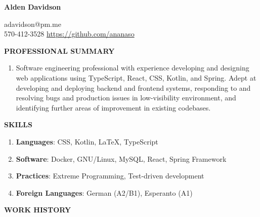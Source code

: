 \documentclass[11pt]{article}
\begin{document}
\begin{center}
\begin{minipage}{0.70\textwidth}
	{\Huge\textbf{Alden Davidson}}
\end{minipage}%
\begin{minipage}{0.30\textwidth}
	\raggedleft
	adavidson@pm.me\\
    570-412-3528
    \url{https://github.com/ananaso}
\end{minipage}
\end{center}
{\Large \textbf{PROFESSIONAL SUMMARY}}
\begin{enumerate}[label={}, itemsep=5pt]
    \item Software engineering professional with experience developing and designing web applications using TypeScript, React, CSS, Kotlin, and Spring. Adept at developing and deploying backend and frontend systems, responding to and resolving bugs and production issues in low-visibility environment, and identifying further areas of improvement in existing codebases.
\end{enumerate}
{\Large \textbf{SKILLS}}
\begin{enumerate}[label={}, itemsep=5pt]
    \item \textbf{Languages}: CSS, Kotlin, \LaTeX, TypeScript
    \item \textbf{Software}: Docker, GNU/Linux, MySQL, React, Spring Framework
    \item \textbf{Practices}: Extreme Programming, Test-driven development
    \item \textbf{Foreign Languages}: German (A2/B1), Esperanto (A1)
\end{enumerate}
{\Large \textbf{WORK HISTORY}}
\end{document}
